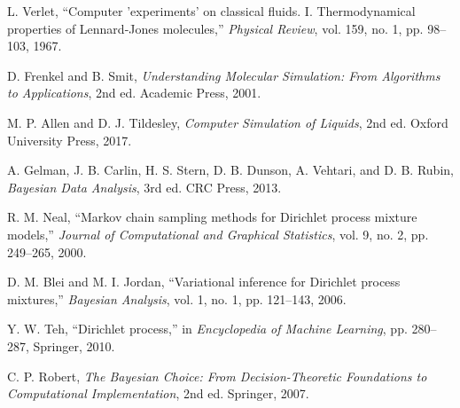 \documentclass[11pt,a4paper]{article}
\begin{document}
\begin{thebibliography}{99}
L. Verlet, ``Computer 'experiments' on classical fluids. I. Thermodynamical properties of Lennard-Jones molecules,'' \textit{Physical Review}, vol. 159, no. 1, pp. 98--103, 1967.

D. Frenkel and B. Smit, \textit{Understanding Molecular Simulation: From Algorithms to Applications}, 2nd ed. Academic Press, 2001.

M. P. Allen and D. J. Tildesley, \textit{Computer Simulation of Liquids}, 2nd ed. Oxford University Press, 2017.

A. Gelman, J. B. Carlin, H. S. Stern, D. B. Dunson, A. Vehtari, and D. B. Rubin, \textit{Bayesian Data Analysis}, 3rd ed. CRC Press, 2013.

R. M. Neal, ``Markov chain sampling methods for Dirichlet process mixture models,'' \textit{Journal of Computational and Graphical Statistics}, vol. 9, no. 2, pp. 249--265, 2000.

D. M. Blei and M. I. Jordan, ``Variational inference for Dirichlet process mixtures,'' \textit{Bayesian Analysis}, vol. 1, no. 1, pp. 121--143, 2006.

Y. W. Teh, ``Dirichlet process,'' in \textit{Encyclopedia of Machine Learning}, pp. 280--287, Springer, 2010.

C. P. Robert, \textit{The Bayesian Choice: From Decision-Theoretic Foundations to Computational Implementation}, 2nd ed. Springer, 2007.

\end{thebibliography}
\end{document}

